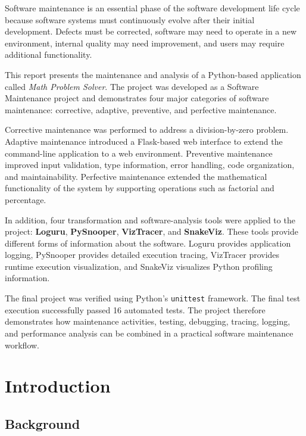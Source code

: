 \documentclass[12pt,a4paper]{report}
\begin{document}
Software maintenance is an essential phase of the software
development life cycle because software systems must continuously
evolve after their initial development. Defects must be corrected,
software may need to operate in a new environment, internal quality
may need improvement, and users may require additional functionality.

This report presents the maintenance and analysis of a Python-based
application called \textit{Math Problem Solver}. The project was
developed as a Software Maintenance project and demonstrates four
major categories of software maintenance: corrective, adaptive,
preventive, and perfective maintenance.

Corrective maintenance was performed to address a division-by-zero
problem. Adaptive maintenance introduced a Flask-based web interface
to extend the command-line application to a web environment.
Preventive maintenance improved input validation, type information,
error handling, code organization, and maintainability. Perfective
maintenance extended the mathematical functionality of the system by
supporting operations such as factorial and percentage.

In addition, four transformation and software-analysis tools were
applied to the project: \textbf{Loguru}, \textbf{PySnooper},
\textbf{VizTracer}, and \textbf{SnakeViz}. These tools provide
different forms of information about the software. Loguru provides
application logging, PySnooper provides detailed execution tracing,
VizTracer provides runtime execution visualization, and SnakeViz
visualizes Python profiling information.

The final project was verified using Python's \texttt{unittest}
framework. The final test execution successfully passed 16 automated
tests. The project therefore demonstrates how maintenance activities,
testing, debugging, tracing, logging, and performance analysis can be
combined in a practical software maintenance workflow.


\chapter{Introduction}

\section{Background}
\end{document}
